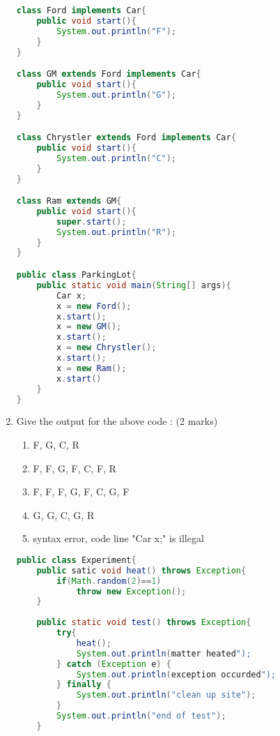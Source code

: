 \documentclass{article}
\begin{document}
\begin{enumerate}[label=\arabic* --,resume]
\begin{lstlisting}[language=Java, left=numbers]
class Ford implements Car{
	public void start(){
		System.out.println("F");
	}
}

class GM extends Ford implements Car{
	public void start(){
		System.out.println("G");
	}
}

class Chrystler extends Ford implements Car{
	public void start(){
		System.out.println("C");
	}
}

class Ram extends GM{
	public void start(){
		super.start();
		System.out.println("R");
	}
}

public class ParkingLot{
	public static void main(String[] args){
		Car x;
		x = new Ford();
		x.start();
		x = new GM();
		x.start();
		x = new Chrystler();
		x.start();
		x = new Ram();
		x.start()
	}
}
	\end{lstlisting}
	\item Give the output for the above code : (2 marks)
	\begin{enumerate}
		\item F, G, C, R
		\item F, F, G, F, C, F, R
		\item F, F, F, G, F, C, G, F
		\item G, G, C, G, R
		\item syntax error, code line "Car x;" is illegal
	\end{enumerate}
	\begin{lstlisting}[language=Java, left=numbers]
public class Experiment{
	public satic void heat() throws Exception{
		if(Math.random(2)==1)
			throw new Exception();
	}
	
	public static void test() throws Exception{
		try{
			heat();
			System.out.println(matter heated");
		} catch (Exception e) {
			System.out.println(exception occurded");
		} finally {
			System.out.println("clean up site");
		}
		System.out.println("end of test");
	}
	

\end{lstlisting}
\end{enumerate}
\end{document}

